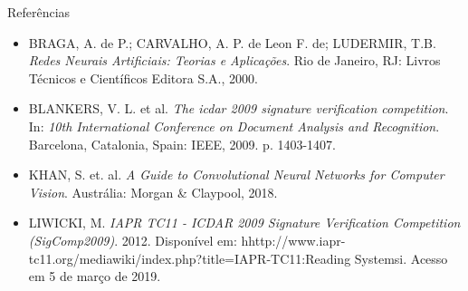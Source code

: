 
\begin{frame}{Referências}
\begin{itemize}
\footnotesize
\item BRAGA, A. de P.; CARVALHO, A. P. de Leon F. de; LUDERMIR, T.B. \emph{Redes Neurais Artificiais: Teorias e Aplicações}. Rio de Janeiro, RJ: Livros Técnicos e Científicos Editora S.A., 2000.
\ \ \newline
\item BLANKERS, V. L. et al. \emph{The icdar 2009 signature verification competition}. In: \emph{10th International Conference on Document Analysis and Recognition}. Barcelona, Catalonia, Spain: IEEE, 2009. p. 1403-1407.
\ \ \newline
\item KHAN, S. et. al. \emph{A Guide to Convolutional Neural Networks for Computer Vision}. Austrália: Morgan \& Claypool, 2018.
\ \ \newline
\item LIWICKI, M. \emph{IAPR TC11 - ICDAR 2009 Signature Verification Competition (SigComp2009)}. 2012. Disponível em: hhttp://www.iapr-tc11.org/mediawiki/index.php?title=IAPR-TC11:Reading Systemsi. Acesso em 5 de março de 2019.
\end{itemize}
\end{frame}
